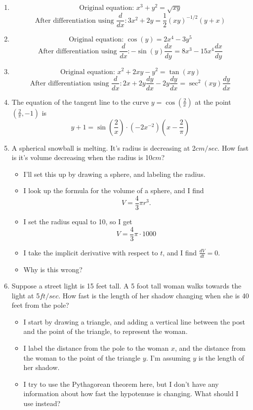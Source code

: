 \documentclass{article}
\begin{document}
\begin{enumerate}
\item $$\mbox{Original equation: } x^3 + y^2 = \sqrt{xy}$$ $$\mbox{After differentiation using } \frac{d}{dx}:  3x^2 + 2y = \frac{1}{2}(xy)^{-1/2}(y + x)$$
\item $$\mbox{Original equation: } \cos(y) = 2x^4 - 3y^5$$
$$\mbox{After differentiation using } \frac{d}{dx}:  -\sin(y) \frac{dx}{dy} = 8x^3 - 15x^4 \frac{dx}{dy}$$
\item $$\mbox{Original equation: } x^2 + 2xy - y^2 = \tan(xy)$$
$$\mbox{After differentiation using } \frac{d}{dx}:  2x + 2y\frac{dy}{dx} - 2y\frac{dy}{dx} = \sec^2(xy) \frac{dy}{dx}$$

\item The equation of the tangent line to the curve $y = \cos(\frac{2}{x})$ at the point $(\frac{2}{\pi},-1)$ is $$y+1 = \sin(\frac{2}{x})\cdot(-2x^{-2})(x-\frac{2}{\pi})$$

\item A spherical snowball is melting. It's radius is decreasing at 2$cm/sec$. How fast is it's volume decreasing when the radius is 10$cm$?
\begin{itemize}
\item I'll set this up by drawing a sphere, and labeling the radius.
\item I look up the formula for the volume of a sphere, and I find $$V = \frac{4}{3} \pi r^3.$$
\item I set the radius equal to 10, so I get $$V = \frac{4}{3} \pi \cdot 1000$$
\item I take the implicit derivative with respect to $t$, and I find $\frac{dV}{dt} = 0$.
\item Why is this wrong?
\end{itemize}
\item Suppose a street light is 15 feet tall. A 5 foot tall woman walks towards the light at 5$ft/sec$. How fast is the length of her shadow changing when she is 40 feet from the pole?
\begin{itemize}
\item I start by drawing a triangle, and adding a vertical line between the post and the point of the triangle, to represent the woman.
\item I label the distance from the pole to the woman $x$, and the distance from the woman to the point of the triangle $y$. I'm assuming $y$ is the length of her shadow.
\item I try to use the Pythagorean theorem here, but I don't have any information about how fast the hypotenuse is changing. What should I use instead?
\end{itemize}
\end{enumerate}
\end{document}
